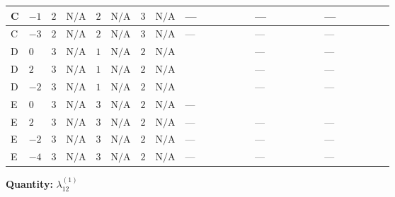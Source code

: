 \documentclass[8pt]{article}
\begin{document}
\begin{landscape}
\begin{longtable}{@{}llcccccc >{\raggedright\arraybackslash}p{0.21\linewidth} >{\raggedright\arraybackslash}p{0.21\linewidth} >{\raggedright\arraybackslash}p{0.21\linewidth}@{}}
\midrule
C & $-1$ & $2$ & $\text{N/A}$ & $2$ & $\text{N/A}$ & $3$ & $\text{N/A}$ & --- & --- & --- \\
\midrule
C & $-3$ & $2$ & $\text{N/A}$ & $2$ & $\text{N/A}$ & $3$ & $\text{N/A}$ & --- & --- & --- \\
\midrule
D & $0$ & $3$ & $\text{N/A}$ & $1$ & $\text{N/A}$ & $2$ & $\text{N/A}$ & \scriptsize\adjustbox{max width=\linewidth}{$\begin{gathered} +4 {\lambda_{12}^{(1)}} {\lambda_{S_1}^{(A)}}\end{gathered}$} & --- & --- \\
\midrule
D & $2$ & $3$ & $\text{N/A}$ & $1$ & $\text{N/A}$ & $2$ & $\text{N/A}$ & \scriptsize\adjustbox{max width=\linewidth}{$\begin{gathered} +4 {\lambda_{12}^{(1)}} {\lambda_{S_1}^{(A)}}\end{gathered}$} & --- & --- \\
\midrule
D & $-2$ & $3$ & $\text{N/A}$ & $1$ & $\text{N/A}$ & $2$ & $\text{N/A}$ & \scriptsize\adjustbox{max width=\linewidth}{$\begin{gathered} +4 {\lambda_{12}^{(1)}} {\lambda_{S_1}^{(A)}}\end{gathered}$} & --- & --- \\
\midrule
E & $0$ & $3$ & $\text{N/A}$ & $3$ & $\text{N/A}$ & $2$ & $\text{N/A}$ & --- & \scriptsize\adjustbox{max width=\linewidth}{$\begin{gathered} +4 {\lambda_{X_{9}}} (5 \left({\lambda_{X_{5}}^{(1)}}\right)^{*}+\left({\lambda_{X_{5}}^{(2)}}\right)^{*})\end{gathered}$} & \scriptsize\adjustbox{max width=\linewidth}{$\begin{gathered} +4 {\lambda_{X_{5}}^{(2)}} (\left({\lambda_{X_{5}}^{(2)}}\right)^{*}+\left({\lambda_{X_{9}}}\right)^{*})\end{gathered}$} \\
\midrule
E & $2$ & $3$ & $\text{N/A}$ & $3$ & $\text{N/A}$ & $2$ & $\text{N/A}$ & --- & --- & --- \\
\midrule
E & $-2$ & $3$ & $\text{N/A}$ & $3$ & $\text{N/A}$ & $2$ & $\text{N/A}$ & --- & --- & --- \\
\midrule
E & $-4$ & $3$ & $\text{N/A}$ & $3$ & $\text{N/A}$ & $2$ & $\text{N/A}$ & --- & --- & --- \\
\midrule
\bottomrule
\end{longtable}
\clearpage
\noindent\textbf{Quantity: }$\lambda_{12}^{(1)}$\par\smallskip

\end{landscape}
\end{document}
